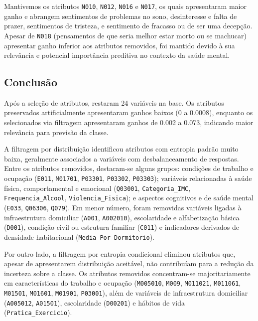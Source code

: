 \documentclass{article}
\begin{document}
Mantivemos os atributos \texttt{N010}, \texttt{N012}, \texttt{N016} e \texttt{N017}, os quais apresentaram maior ganho e abrangem sentimentos de problemas no sono, desinteresse e falta de prazer, sentimentos de tristeza, e sentimento de fracasso ou de ser uma decepção. Apesar de \texttt{N018} (pensamentos de que seria melhor estar morto ou se machucar) apresentar ganho inferior aos atributos removidos, foi mantido devido à sua relevância e potencial importância preditiva no contexto da saúde mental.

\subsection*{Conclusão}

Após a seleção de atributos, restaram 24 variáveis na base. Os atributos preservados artificialmente apresentaram ganhos baixos (0 a 0.0008), enquanto os selecionados via filtragem apresentaram ganhos de 0.002 a 0.073, indicando maior relevância para previsão da classe.

A filtragem por distribuição identificou atributos com entropia padrão muito baixa, geralmente associados a variáveis com desbalanceamento de respostas. Entre os atributos removidos, destacam-se alguns grupos: condições de trabalho e ocupação (\texttt{E011}, \texttt{M01701}, \texttt{P03301}, \texttt{P03302}, \texttt{P03303}); variáveis relacionadas à saúde física, comportamental e emocional (\texttt{Q03001}, \texttt{Categoria\_IMC}, \texttt{Frequencia\_Alcool}, \texttt{Violencia\_Fisica}); e aspectos cognitivos e de saúde mental (\texttt{E033}, \texttt{Q06306}, \texttt{Q079}). Em menor número, foram removidas variáveis ligadas à infraestrutura domiciliar (\texttt{A001}, \texttt{A002010}), escolaridade e alfabetização básica (\texttt{D001}), condição civil ou estrutura familiar (\texttt{C011}) e indicadores derivados de densidade habitacional (\texttt{Media\_Por\_Dormitorio}).

Por outro lado, a filtragem por entropia condicional eliminou atributos que, apesar de apresentarem distribuição aceitável, não contribuíam para a redução da incerteza sobre a classe. Os atributos removidos concentram-se majoritariamente em características do trabalho e ocupação (\texttt{M005010}, \texttt{M009}, \texttt{M011021}, \texttt{M011061}, \texttt{M01501}, \texttt{M01601}, \texttt{M01901}, \texttt{P03001}), além de variáveis de infraestrutura domiciliar (\texttt{A005012}, \texttt{A01501}), escolaridade (\texttt{D00201}) e hábitos de vida (\texttt{Pratica\_Exercicio}).
\end{document}
